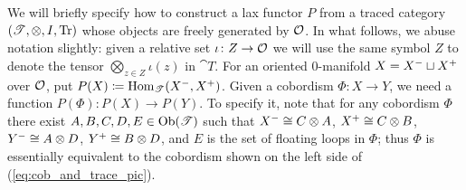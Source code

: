 \documentclass[11pt,oneside,article]{memoir}
\begin{document}
We will briefly specify how to construct a lax functor $P$ from a traced category $(\mathscr{T},\otimes,I,\operatorname{Tr})$ whose objects are freely generated by $\mathcal{O}$. In what follows, we abuse notation slightly: given a relative set $\iota\colon Z\to\mathcal{O}$ we will use the same symbol $Z$ to denote the tensor $\bigotimes_{z\in Z}\iota(z)$ in $\cat{T}$.  For an oriented 0-manifold $X=X^-\sqcup X^+$ over $\mathcal{O}$, put $P(X)\coloneqq\operatorname{Hom}_{\mathscr{T}}(X^-,X^+)$. Given a cobordism $\Phi\colon X\to Y$, we need a function $P(\Phi)\colon P(X)\to P(Y)$. To specify it, note that for any cobordism $\Phi$ there exist $A,B,C,D,E\in\mathrm{Ob}(\mathscr{T})$ such that $X^-\cong C\otimes A$, $X^+\cong C\otimes B$, $Y^-\cong A\otimes D$, $Y^+\cong B\otimes D$, and $E$ is the set of floating loops in $\Phi$; thus $\Phi$ is essentially equivalent to the cobordism shown on the left side of (\ref{eq:cob_and_trace_pic}).
\end{document}

